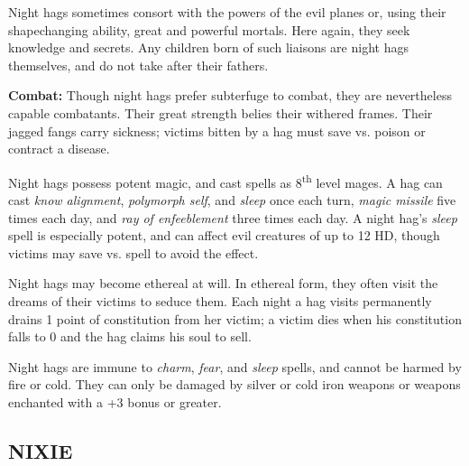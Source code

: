 \begin{multicols}{2}
Night hags sometimes consort with the powers of the evil planes or, using their shapechanging ability, great and powerful mortals. Here again, they seek knowledge and secrets. Any children born of such liaisons are night hags themselves, and do not take after their fathers.

\textbf{Combat:} Though night hags prefer subterfuge to combat, they are nevertheless capable combatants. Their great strength belies their withered frames. Their jagged fangs carry sickness; victims bitten by a hag must save vs. poison or contract a disease.

Night hags possess potent magic, and cast spells as 8\textsuperscript{th} level mages. A hag can cast \textit{know alignment}, \textit{polymorph self}, and \textit{sleep} once each turn, \textit{magic missile} five times each day, and \textit{ray of enfeeblement} three times each day. A night hag's \textit{sleep} spell is especially potent, and can affect evil creatures of up to 12 HD, though victims may save vs. spell to avoid the effect.

Night hags may become ethereal at will. In ethereal form, they often visit the dreams of their victims to seduce them. Each night a hag visits permanently drains 1 point of constitution from her victim; a victim dies when his constitution falls to 0 and the hag claims his soul to sell.

Night hags are immune to \textit{charm}, \textit{fear}, and \textit{sleep} spells, and cannot be harmed by fire or cold. They can only be damaged by silver or cold iron weapons or weapons enchanted with a +3 bonus or greater.

\noindent
\begin{minipage}{\columnwidth}

\vspace{1em}

\subsection{NIXIE}


\end{minipage}
\end{multicols}
